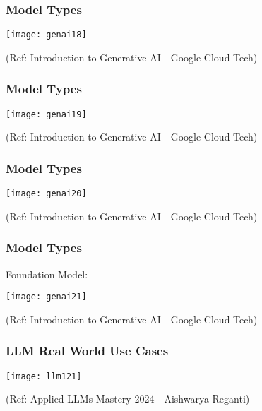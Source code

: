 \begin{frame}[fragile]\frametitle{Model Types}

\begin{center}
\texttt{[image: genai18]}
\end{center}


{\tiny (Ref: Introduction to Generative AI - Google Cloud Tech)}

\end{frame}

\begin{frame}[fragile]\frametitle{Model Types}

\begin{center}
\texttt{[image: genai19]}
\end{center}


{\tiny (Ref: Introduction to Generative AI - Google Cloud Tech)}

\end{frame}

\begin{frame}[fragile]\frametitle{Model Types}

\begin{center}
\texttt{[image: genai20]}
\end{center}


{\tiny (Ref: Introduction to Generative AI - Google Cloud Tech)}

\end{frame}

\begin{frame}[fragile]\frametitle{Model Types}
Foundation Model:

\begin{center}
\texttt{[image: genai21]}
\end{center}


{\tiny (Ref: Introduction to Generative AI - Google Cloud Tech)}

\end{frame}


\begin{frame}[fragile]\frametitle{LLM Real World Use Cases}

\begin{center}
\texttt{[image: llm121]}
\end{center}				

{\tiny (Ref: Applied LLMs Mastery 2024 - Aishwarya Reganti)}

\end{frame}

